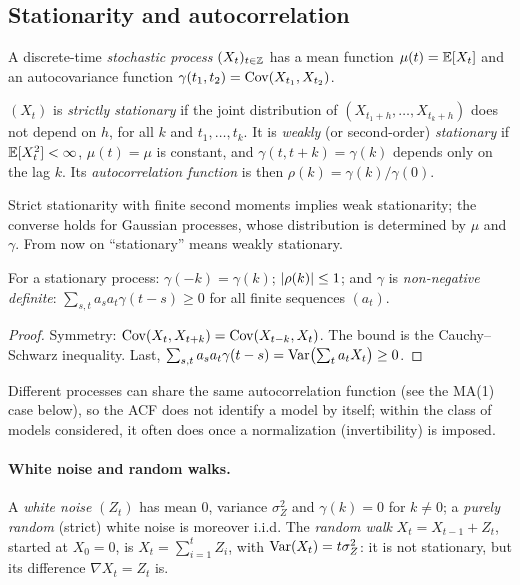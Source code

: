 \begin{notechapter}
\section{Stationarity and autocorrelation}\label{linear-time-series:sec:stationarity}

A discrete-time \emph{stochastic process} $(X_t)_{t\in\mathbb{Z}}$ has a mean function $\mu(t) = \mathbb{E}[X_t]$ and an
autocovariance function $\gamma(t_1, t_2) = \operatorname{Cov}(X_{t_1}, X_{t_2})$.

\begin{definition}[Stationarity]
$(X_t)$ is \emph{strictly stationary} if the joint distribution of $(X_{t_1 + h},\dots,X_{t_k + h})$ does not depend
on $h$, for all $k$ and $t_1,\dots,t_k$. It is \emph{weakly} (or second-order) \emph{stationary} if $\mathbb{E}[X_t^2]<\infty$,
$\mu(t) = \mu$ is constant, and $\gamma(t, t + k) = \gamma(k)$ depends only on the lag $k$. Its
\emph{autocorrelation function} is then $\rho(k) = \gamma(k)/\gamma(0)$.
\end{definition}

Strict stationarity with finite second moments implies weak stationarity; the converse
holds for Gaussian processes, whose distribution is determined by $\mu$ and $\gamma$. From now on
``stationary'' means weakly stationary.

\begin{proposition}\label{linear-time-series:prop:acf}
For a stationary process: $\gamma(-k) = \gamma(k)$; $\left|\rho(k)\right|\leq1$; and $\gamma$ is \emph{non-negative definite}:
$\sum_{s,t}a_sa_t\gamma(t - s)\geq0$ for all finite sequences $(a_t)$.
\end{proposition}

\begin{proof}
Symmetry: $\operatorname{Cov}(X_t, X_{t+k}) = \operatorname{Cov}(X_{t-k}, X_t)$. The bound is the Cauchy--Schwarz inequality. Last,
$\sum_{s,t}a_sa_t\gamma(t - s) = \operatorname{Var}\bigl(\sum_ta_tX_t\bigr)\geq0$.
\end{proof}

Different processes can share the same autocorrelation function (see the MA(1) case
below), so the ACF does not identify a model by itself; within the class of models
considered, it often does once a normalization (invertibility) is imposed.

\paragraph{White noise and random walks.} A \emph{white noise} $(Z_t)$ has mean $0$, variance
$\sigma_Z^2$ and $\gamma(k) = 0$ for $k\neq0$; a \emph{purely random} (strict) white noise is moreover i.i.d. The
\emph{random walk} $X_t = X_{t-1} + Z_t$, started at $X_0 = 0$, is $X_t = \sum_{i=1}^tZ_i$, with $\operatorname{Var}(X_t) = t\sigma_Z^2$: it is not
stationary, but its difference $\nabla X_t = Z_t$ is.


\end{notechapter}
